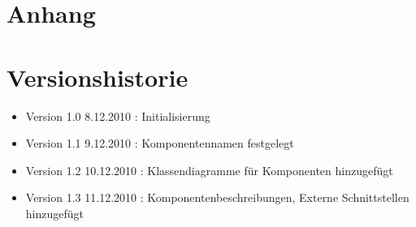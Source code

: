 \documentclass[a4paper,12pt]{scrartcl}
\begin{document}

\appendix%

\section{Anhang}

\section{Versionshistorie}
\begin{itemize}
\item Version 1.0 8.12.2010 : Initialisierung
\item Version 1.1 9.12.2010 : Komponentennamen festgelegt
\item Version 1.2 10.12.2010 : Klassendiagramme für Komponenten hinzugefügt
\item Version 1.3 11.12.2010 : Komponentenbeschreibungen, Externe Schnittstellen hinzugefügt
\end{itemize}
\end{document}
